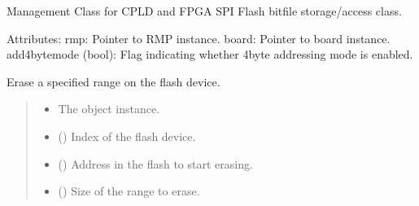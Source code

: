 \documentclass[letterpaper,10pt,english]{sphinxmanual}
\begin{document}
\begin{fulllineitems}
\label{\detokenize{cplddocs:management_flash.MngProgFlash}}
\pysigstartsignatures
{}
\pysigstopsignatures
\sphinxAtStartPar
Management Class for CPLD and FPGA SPI Flash bitfile storage/access class.

\sphinxAtStartPar
Attributes:
\sphinxhyphen{} rmp: Pointer to RMP instance.
\sphinxhyphen{} board: Pointer to board instance.
\sphinxhyphen{} add4bytemode (bool): Flag indicating whether 4\sphinxhyphen{}byte addressing mode is enabled.

\begin{fulllineitems}
\label{\detokenize{cplddocs:management_flash.MngProgFlash.DeviceErase}}
\pysigstartsignatures
{}
\pysigstopsignatures
\sphinxAtStartPar
Erase a specified range on the flash device.
\begin{quote}\begin{description}
\begin{itemize}
\item {} 
\sphinxAtStartPar
{} \textendash{} The object instance.

\item {} 
\sphinxAtStartPar
{} () \textendash{} Index of the flash device.

\item {} 
\sphinxAtStartPar
{} () \textendash{} Address in the flash to start erasing.

\item {} 
\sphinxAtStartPar
{} () \textendash{} Size of the range to erase.


\end{itemize}
\end{description}
\end{quote}
\end{fulllineitems}
\end{fulllineitems}
\end{document}
